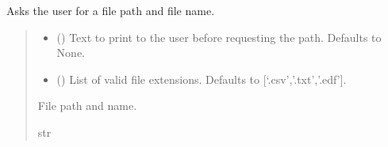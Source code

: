 \documentclass[letterpaper,10pt,english]{sphinxmanual}
\begin{document}
\begin{fulllineitems}
\begin{fulllineitems}
\label{\detokenize{GetUserInput:GetUserInput.UserInput.GetFilePath}}
\pysigstartsignatures
{}
\pysigstopsignatures
\sphinxAtStartPar
Asks the user for a file path and file name.
\begin{quote}\begin{description}
\begin{itemize}
\item {} 
\sphinxAtStartPar
{} (\sphinxstyleliteralemphasis{\sphinxupquote{ | }}\sphinxstyleliteralemphasis{\sphinxupquote{, }}) \textendash{} Text to print to the user before requesting the path. Defaults to None.

\item {} 
\sphinxAtStartPar
{} (\sphinxstyleliteralemphasis{\sphinxupquote{{[}}}\sphinxstyleliteralemphasis{\sphinxupquote{{]}}}\sphinxstyleliteralemphasis{\sphinxupquote{, }}) \textendash{} List of valid file extensions. Defaults to {[}‘.csv’,’.txt’,’.edf’{]}.

\end{itemize}

\sphinxAtStartPar
File path and name.

\sphinxAtStartPar
str

\end{description}\end{quote}

\end{fulllineitems}


\end{fulllineitems}
\end{document}
